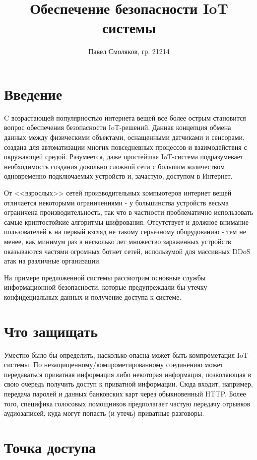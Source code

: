 \documentclass{article}
\title{Обеспечение безопасности IoT системы}
\author{Павел Смоляков, гр. 21214}
\begin{document}
\maketitle

\section{Введение}
C возрастающей популярностью интернета вещей все более острым становится вопрос обеспечения безопасности IoT-решений. Данная концепция обмена данных между физическими объектами, оснащенными датчиками и сенсорами, создана для автоматизации многих повседневных процессов и взаимодействия с окружающей средой. Разумеется, даже простейшая IoT-система подразумевает необходимость создания довольно сложной сети с большим количеством одновременно подключаемых устройств и, зачастую, доступом в Интернет. 

От <<взрослых>> сетей производительных компьютеров интернет вещей отличается некоторыми ограничениями - у большинства устройств весьма ограничена производительность, так что в частности проблематично использовать самые криптостойкие алгоритмы шифрования. Отсутствует и должное внимание пользователей к на первый взгляд не такому серьезному оборудованию - тем не менее, как минимум раз в несколько лет \cite{ddos-study} множество зараженных устройств оказываются частями огромных ботнет сетей, использумой для массивных DDoS атак на различные организации. 

На примере предложенной системы рассмотрим основные службы информационной безопасности, которые предупреждали бы утечку конфидециальных данных и получение доступа к системе.

\section{Что защищать}
Уместно было бы определить, насколько опасна может быть компрометация IoT-системы.
По незащищенному/компрометированному соединению может передаваться приватная информация либо некоторая информация, позволяющая в свою очередь получить доступ к приватной информации. Сюда входит, например, передача паролей и данных банковских карт через обыкновенный HTTP. Более того, специфика голосовых помощников предполагает частую передачу отрывков аудиозаписей, куда могут попасть (и утечь) приватные разговоры.

\section{Точка доступа}
\end{document}

